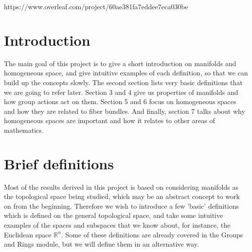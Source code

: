 \documentclass[12pt,twoside]{article}
\newcommand{\rn}{$\mathbb{R}^n$}
\begin{document}

\newpage https://www.overleaf.com/project/60ae381fa7eddee7eca030be
\tableofcontents{}
\newpage
\section{Introduction}


The main goal of this project is to give a short introduction on manifolds and homogeneous space, and give intuitive examples of each definition, so that we can build up the concepts slowly. The second section lists very basic definitions that we are going to refer later. Section 3 and 4 give us properties of manifolds and how group actions act on them. Section 5 and 6 focus on homogeneous spaces and how they are related to fiber bundles. And finally, section 7 talks about why homogeneous spaces are important and how it relates to other areas of mathematics.

\section{Brief definitions}
Most of the results derived in this project is based on considering manifolds as the topological space being studied, which may be an abstract concept to work on from the beginning. Therefore we wish to introduce a few 'basic' definitions which is defined on the general topological space, and take some intuitive examples of the spaces and subspaces that we know about, for instance, the Euclidean space \rn. Some of these definitions are already covered in the Groups and Rings module, but we will define them in an alternative way.


\end{document}
